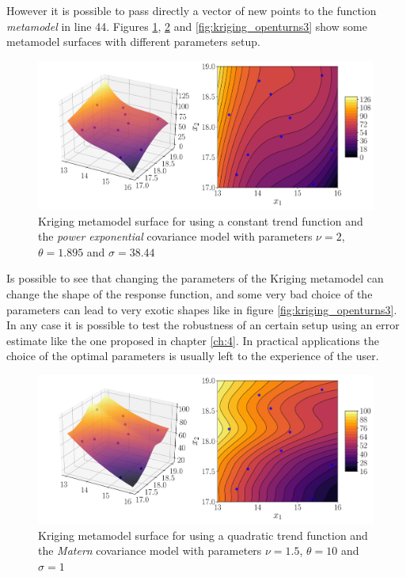 \newpage

However it is possible to pass directly a vector of new points to the function \textit{metamodel} in line 44. Figures \ref{fig:kriging_openturns}, \ref{fig:kriging_openturns2} and \ref{fig:kriging_openturns3} show some metamodel surfaces with different parameters setup.

\begin{figure}[h]
\centering
\includegraphics[width=0.9\linewidth]{appendix_a/kriging_openturns}
\caption{Kriging metamodel surface for using a constant trend function and the \textit{power exponential} covariance model with parameters $\nu=2$, $\theta=1.895$ and $\sigma=38.44$}
\label{fig:kriging_openturns}
\end{figure}

Is possible to see that changing the parameters of the Kriging metamodel can change the shape of the response function, and some very bad choice of the parameters can lead to very exotic shapes like in figure \ref{fig:kriging_openturns3}. In any case it is possible to test the robustness of an certain setup using an error estimate like the one proposed in chapter \ref{ch:4}. In practical applications the choice of the optimal parameters is usually left to the experience of the user.

\begin{figure}[h]
	\centering
	\includegraphics[width=0.9\linewidth]{appendix_a/kriging_openturns2}
	\caption{Kriging metamodel surface for using a quadratic trend function and the \textit{Matern} covariance model with parameters $\nu=1.5$, $\theta=10$ and $\sigma=1$}
	\label{fig:kriging_openturns2}
\end{figure}

